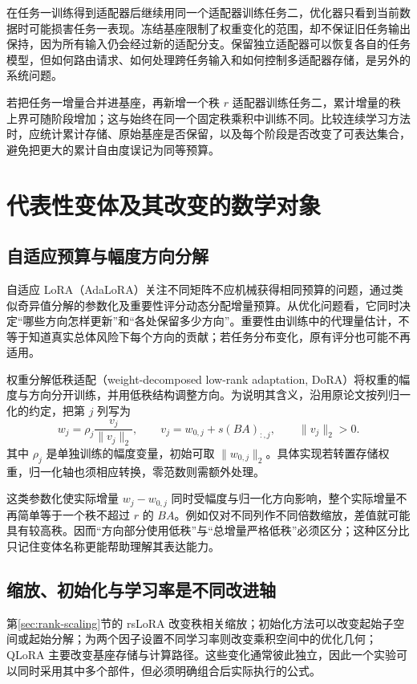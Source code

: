 \documentclass[UTF8,12pt,a4paper,fontset=fandol]{ctexart}
\begin{document}
在任务一训练得到适配器后继续用同一个适配器训练任务二，优化器只看到当前数据时可能损害任务一表现。冻结基座限制了权重变化的范围，却不保证旧任务输出保持，因为所有输入仍会经过新的适配分支。保留独立适配器可以恢复各自的任务模型，但如何路由请求、如何处理跨任务输入和如何控制多适配器存储，是另外的系统问题。

若把任务一增量合并进基座，再新增一个秩 $r$ 适配器训练任务二，累计增量的秩上界可随阶段增加；这与始终在同一个固定秩乘积中训练不同。比较连续学习方法时，应统计累计存储、原始基座是否保留，以及每个阶段是否改变了可表达集合，避免把更大的累计自由度误记为同等预算。

\section{代表性变体及其改变的数学对象}
\label{sec:variants}

\subsection{自适应预算与幅度方向分解}

自适应 LoRA（AdaLoRA）关注不同矩阵不应机械获得相同预算的问题，通过类似奇异值分解的参数化及重要性评分动态分配增量预算\cite{zhang2023}。从优化问题看，它同时决定“哪些方向怎样更新”和“各处保留多少方向”。重要性由训练中的代理量估计，不等于知道真实总体风险下每个方向的贡献；若任务分布变化，原有评分也可能不再适用。

权重分解低秩适配（weight-decomposed low-rank adaptation, DoRA）将权重的幅度与方向分开训练，并用低秩结构调整方向\cite{liu2024}。为说明其含义，沿用原论文按列归一化的约定，把第 $j$ 列写为
\[
w_j=\rho_j\frac{v_j}{\|v_j\|_2},
\qquad
v_j=w_{0,j}+s(BA)_{:,j},\qquad \|v_j\|_2>0.
\]
其中 $\rho_j$ 是单独训练的幅度变量，初始可取 $\|w_{0,j}\|_2$。具体实现若转置存储权重，归一化轴也须相应转换，零范数则需额外处理。

这类参数化使实际增量 $w_j-w_{0,j}$ 同时受幅度与归一化方向影响，整个实际增量不再简单等于一个秩不超过 $r$ 的 $BA$。例如仅对不同列作不同倍数缩放，差值就可能具有较高秩。因而“方向部分使用低秩”与“总增量严格低秩”必须区分；这种区分比只记住变体名称更能帮助理解其表达能力。

\subsection{缩放、初始化与学习率是不同改进轴}

第\ref{sec:rank-scaling}节的 rsLoRA 改变秩相关缩放；初始化方法可以改变起始子空间或起始分解；为两个因子设置不同学习率则改变乘积空间中的优化几何；QLoRA 主要改变基座存储与计算路径。这些变化通常彼此独立，因此一个实验可以同时采用其中多个部件，但必须明确组合后实际执行的公式。
\end{document}
